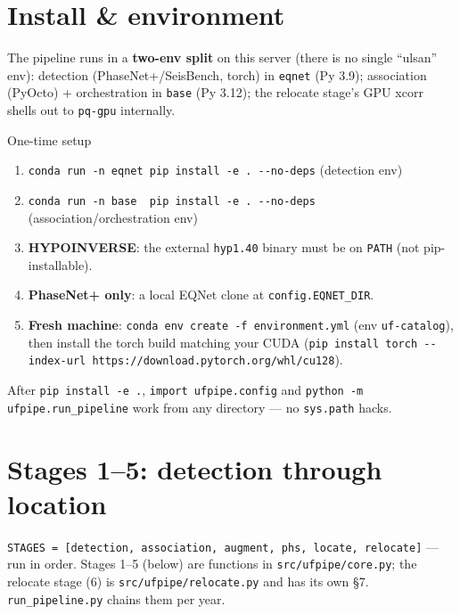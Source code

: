 \documentclass[11pt]{article}
\newcommand{\code}[1]{\texttt{#1}}
\begin{document}
\section{Install \& environment}

The pipeline runs in a \textbf{two-env split} on this server (there is no single ``ulsan'' env):
detection (PhaseNet+/SeisBench, torch) in \code{eqnet} (Py 3.9); association (PyOcto) + orchestration in
\code{base} (Py 3.12); the relocate stage's GPU xcorr shells out to \code{pq-gpu} internally.

\begin{keybox}{One-time setup}
\begin{enumerate}[leftmargin=6mm,itemsep=0.5mm]
\item \code{conda run -n eqnet pip install -e . -{}-no-deps} \hfill(detection env)
\item \code{conda run -n base~ pip install -e . -{}-no-deps} \hfill(association/orchestration env)
\item \textbf{HYPOINVERSE}: the external \code{hyp1.40} binary must be on \code{PATH} (not pip-installable).
\item \textbf{PhaseNet+ only}: a local EQNet clone at \code{config.EQNET\_DIR}.
\item \textbf{Fresh machine}: \code{conda env create -f environment.yml} (env \code{uf-catalog}), then install the
      torch build matching your CUDA (\code{pip install torch -{}-index-url https://download.pytorch.org/whl/cu128}).
\end{enumerate}
\end{keybox}

After \code{pip install -e .}, \code{import ufpipe.config} and \code{python -m ufpipe.run\_pipeline} work from any
directory — no \code{sys.path} hacks.

\section{Stages 1--5: detection through location}

\code{STAGES = [detection, association, augment, phs, locate, relocate]} — run in order. Stages 1--5 (below) are
functions in \code{src/ufpipe/core.py}; the relocate stage (6) is \code{src/ufpipe/relocate.py} and has its own
\S7. \code{run\_pipeline.py} chains them per year.
\end{document}

